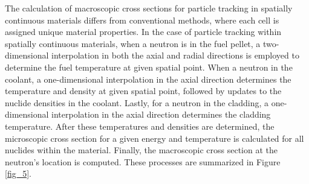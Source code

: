 The calculation of macroscopic cross sections for particle tracking in spatially continuous materials differs from conventional methods, where each cell is assigned unique material properties. In the case of particle tracking within spatially continuous materials, when a neutron is in the fuel pellet, a two-dimensional interpolation in both the axial and radial directions is employed to determine the fuel temperature at given spatial point. When a neutron in the coolant, a one-dimensional interpolation in the axial direction determines the temperature and density at given spatial point, followed by updates to the nuclide densities in the coolant. Lastly, for a neutron in the cladding, a one-dimensional interpolation in the axial direction determines the cladding temperature. After these temperatures and densities are determined, the microscopic cross section for a given energy and temperature is calculated for all nuclides within the material. Finally, the macroscopic cross section at the neutron's location is computed. These processes are summarized in Figure \ref{fig_5}.

